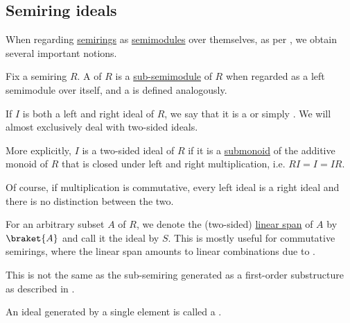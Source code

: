\subsection{Semiring ideals}\label{subsec:semiring_ideals}

When regarding \hyperref[def:semiring]{semirings} as \hyperref[def:semimodule]{semimodules} over themselves, as per , we obtain several important notions.

\begin{definition}\label{def:semiring_ideal}\mimprovised
  Fix a semiring \( R \). A  of \( R \) is a \hyperref[def:semimodule/submodel]{sub-semimodule} of \( R \) when regarded as a left semimodule over itself, and a  is defined analogously.

  If \( I \) is both a left and right ideal of \( R \), we say that it is a  or simply . We will almost exclusively deal with two-sided ideals.

  More explicitly, \( I \) is a two-sided ideal of \( R \) if it is a \hyperref[def:monoid/submodel]{submonoid} of the additive monoid of \( R \) that is closed under left and right multiplication, i.e. \( RI = I = IR \).

  Of course, if multiplication is commutative, every left ideal is a right ideal and there is no distinction between the two.

  \begin{thmenum}
     For an arbitrary subset \( A \) of \( R \), we denote the (two-sided) \hyperref[def:semimodule/submodel]{linear span} of \( A \) by \( \braket{ A } \) and call it the ideal  by \( S \). This is mostly useful for commutative semirings, where the linear span amounts to linear combinations due to .

    This is not the same as the sub-semiring generated as a first-order substructure as described in .

     An ideal generated by a single element is called a .
  \end{thmenum}
\end{definition}


